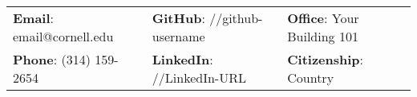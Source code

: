 \documentclass[letterpaper, 11pt]{article}
\begin{document}


\vspace{0.5cm}
\begin{center}
\begin{tabular}{lll}
\textbf{Email}: email@cornell.edu      &
\hspace{0.55in} \textbf{GitHub}: //github-username    &
\hspace{0.4in} 	\textbf{Office}: Your Building 101 \\

\textbf{Phone}: (314) 159-2654   &
\hspace{0.55in} \textbf{LinkedIn}: //LinkedIn-URL   &
\hspace{0.4in} \textbf{Citizenship}: Country
\end{tabular}
\end{center}


\setlength{\tabcolsep}{8pt}
\end{document}
